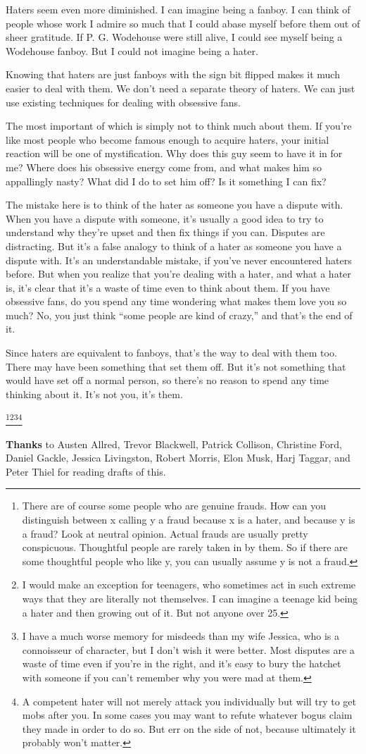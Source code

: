 Haters seem even more diminished. I can imagine being a fanboy. I can
think of people whose work I admire so much that I could abase myself
before them out of sheer gratitude. If P. G. Wodehouse were still alive,
I could see myself being a Wodehouse fanboy. But I could not imagine
being a hater.

Knowing that haters are just fanboys with the sign bit flipped makes it
much easier to deal with them. We don't need a separate theory of
haters. We can just use existing techniques for dealing with obsessive
fans.

The most important of which is simply not to think much about them. If
you're like most people who become famous enough to acquire haters, your
initial reaction will be one of mystification. Why does this guy seem to
have it in for me? Where does his obsessive energy come from, and what
makes him so appallingly nasty? What did I do to set him off? Is it
something I can fix?

The mistake here is to think of the hater as someone you have a dispute
with. When you have a dispute with someone, it's usually a good idea to
try to understand why they're upset and then fix things if you can.
Disputes are distracting. But it's a false analogy to think of a hater
as someone you have a dispute with. It's an understandable mistake, if
you've never encountered haters before. But when you realize that you're
dealing with a hater, and what a hater is, it's clear that it's a waste
of time even to think about them. If you have obsessive fans, do you
spend any time wondering what makes them love you so much? No, you just
think ``some people are kind of crazy,'' and that's the end of it.

Since haters are equivalent to fanboys, that's the way to deal with them
too. There may have been something that set them off. But it's not
something that would have set off a normal person, so there's no reason
to spend any time thinking about it. It's not you, it's them.


\footnote{There are of course some people who are genuine frauds. How can
you distinguish between x calling y a fraud because x is a hater, and
because y is a fraud? Look at neutral opinion. Actual frauds are usually
pretty conspicuous. Thoughtful people are rarely taken in by them. So if
there are some thoughtful people who like y, you can usually assume y is
not a fraud.}\footnote{I would make an exception for teenagers, who sometimes act in
such extreme ways that they are literally not themselves. I can imagine
a teenage kid being a hater and then growing out of it. But not anyone
over 25.}\footnote{I have a much worse memory for misdeeds than my wife Jessica,
who is a connoisseur of character, but I don't wish it were better. Most
disputes are a waste of time even if you're in the right, and it's easy
to bury the hatchet with someone if you can't remember why you were mad
at them.}\footnote{A competent hater will not merely attack you individually but
will try to get mobs after you. In some cases you may want to refute
whatever bogus claim they made in order to do so. But err on the side of
not, because ultimately it probably won't matter.}

\textbf{Thanks} to Austen Allred, Trevor Blackwell, Patrick Collison,
Christine Ford, Daniel Gackle, Jessica Livingston, Robert Morris, Elon
Musk, Harj Taggar, and Peter Thiel for reading drafts of this.